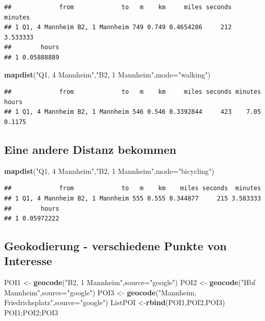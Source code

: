 \documentclass[]{article}
\newenvironment{Shaded}{\begin{snugshade}}{\end{snugshade}}
\newcommand{\KeywordTok}[1]{\textcolor[rgb]{0.13,0.29,0.53}{\textbf{{#1}}}}
\newcommand{\DataTypeTok}[1]{\textcolor[rgb]{0.13,0.29,0.53}{{#1}}}
\newcommand{\StringTok}[1]{\textcolor[rgb]{0.31,0.60,0.02}{{#1}}}
\newcommand{\NormalTok}[1]{{#1}}
\begin{document}
\begin{verbatim}
##             from             to   m    km     miles seconds  minutes
## 1 Q1, 4 Mannheim B2, 1 Mannheim 749 0.749 0.4654286     212 3.533333
##        hours
## 1 0.05888889
\end{verbatim}

\begin{Shaded}
\begin{Highlighting}[]
\KeywordTok{mapdist}\NormalTok{(}\StringTok{"Q1, 4 Mannheim"}\NormalTok{,}\StringTok{"B2, 1 Mannheim"}\NormalTok{,}\DataTypeTok{mode=}\StringTok{"walking"}\NormalTok{)}
\end{Highlighting}
\end{Shaded}

\begin{verbatim}
##             from             to   m    km     miles seconds minutes  hours
## 1 Q1, 4 Mannheim B2, 1 Mannheim 546 0.546 0.3392844     423    7.05 0.1175
\end{verbatim}

\subsection{Eine andere Distanz
bekommen}\label{eine-andere-distanz-bekommen}

\begin{Shaded}
\begin{Highlighting}[]
\KeywordTok{mapdist}\NormalTok{(}\StringTok{"Q1, 4 Mannheim"}\NormalTok{,}\StringTok{"B2, 1 Mannheim"}\NormalTok{,}\DataTypeTok{mode=}\StringTok{"bicycling"}\NormalTok{)}
\end{Highlighting}
\end{Shaded}

\begin{verbatim}
##             from             to   m    km    miles seconds  minutes
## 1 Q1, 4 Mannheim B2, 1 Mannheim 555 0.555 0.344877     215 3.583333
##        hours
## 1 0.05972222
\end{verbatim}

\subsection{Geokodierung - verschiedene Punkte von
Interesse}\label{geokodierung---verschiedene-punkte-von-interesse}

\begin{Shaded}
\begin{Highlighting}[]
\NormalTok{POI1 <-}\StringTok{ }\KeywordTok{geocode}\NormalTok{(}\StringTok{"B2, 1 Mannheim"}\NormalTok{,}\DataTypeTok{source=}\StringTok{"google"}\NormalTok{)}
\NormalTok{POI2 <-}\StringTok{ }\KeywordTok{geocode}\NormalTok{(}\StringTok{"Hbf Mannheim"}\NormalTok{,}\DataTypeTok{source=}\StringTok{"google"}\NormalTok{)}
\NormalTok{POI3 <-}\StringTok{ }\KeywordTok{geocode}\NormalTok{(}\StringTok{"Mannheim, Friedrichsplatz"}\NormalTok{,}\DataTypeTok{source=}\StringTok{"google"}\NormalTok{)}
\NormalTok{ListPOI <-}\KeywordTok{rbind}\NormalTok{(POI1,POI2,POI3)}
\NormalTok{POI1;POI2;POI3}
\end{Highlighting}
\end{Shaded}
\end{document}
